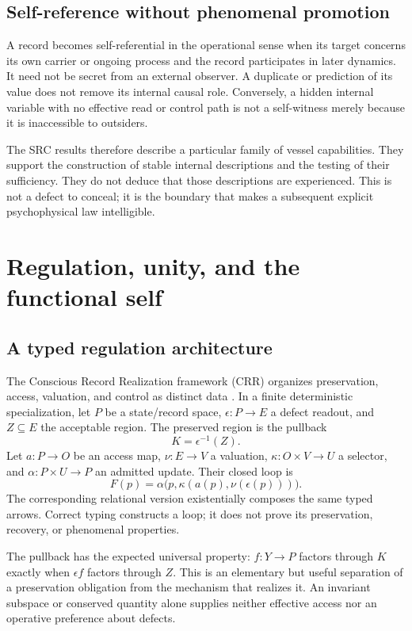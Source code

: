 \section{Self-reference without phenomenal promotion}\label{section:src:self-reference-without-phenomenal-promotion}
A record becomes self-referential in the operational sense when its target concerns its own carrier or ongoing process and the record participates in later dynamics. It need not be secret from an external observer. A duplicate or prediction of its value does not remove its internal causal role. Conversely, a hidden internal variable with no effective read or control path is not a self-witness merely because it is inaccessible to outsiders.

The SRC results therefore describe a particular family of vessel capabilities. They support the construction of stable internal descriptions and the testing of their sufficiency. They do not deduce that those descriptions are experienced. This is not a defect to conceal; it is the boundary that makes a subsequent explicit psychophysical law intelligible.

\chapter{Regulation, unity, and the functional self}\label{ch:crr}
\section{A typed regulation architecture}\label{section:crr:a-typed-regulation-architecture}
The Conscious Record Realization framework (CRR) organizes preservation, access, valuation, and control as distinct data \cite{RodgersCRR}. In a finite deterministic specialization, let $P$ be a state/record space, $\epsilon:P\to E$ a defect readout, and $Z\subseteq E$ the acceptable region. The preserved region is the pullback
\[
K=\epsilon^{-1}(Z).
\]
Let $a:P\to O$ be an access map, $\nu:E\to V$ a valuation, $\kappa:O\times V\to U$ a selector, and $\alpha:P\times U\to P$ an admitted update. Their closed loop is
\begin{equation}\label{eq:crrloop}
F(p)=\alpha\bigl(p,\kappa(a(p),\nu(\epsilon(p)))\bigr).
\end{equation}
The corresponding relational version existentially composes the same typed arrows. Correct typing constructs a loop; it does not prove its preservation, recovery, or phenomenal properties.

The pullback has the expected universal property: $f:Y\to P$ factors through $K$ exactly when $\epsilon f$ factors through $Z$. This is an elementary but useful separation of a preservation obligation from the mechanism that realizes it. An invariant subspace or conserved quantity alone supplies neither effective access nor an operative preference about defects.

